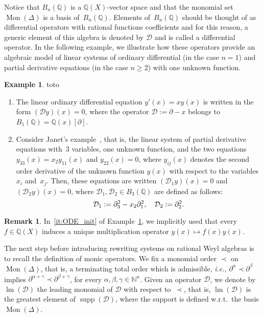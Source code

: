 \documentclass[11pt]{article}
\theoremstyle{definition}
\newtheorem{remark}[theorem]{Remark}
\newtheorem{example}[theorem]{Example}
\newcommand\ie{\emph{i.e.}}
\newcommand\D{\mathcal{D}}
\DeclareMathOperator{\supp}{supp}
\DeclareMathOperator{\lm}{lm}
\newcommand\Q{\mathbb{Q}}
\newcommand\N{\mathbb{N}}
\newcommand\Weyl[1]{B_{#1}(\Q)}
\newcommand\monBasis{\Mon(\Delta)}
\DeclareMathOperator{\Mon}{Mon}
\begin{document}
Notice that $\Weyl{n}$ is a $\Q(X)$-vector space and that the monomial 
set $\monBasis$ is a basis of~$\Weyl{n}$. Elements of~$\Weyl{n}$ should 
be thought of as differential operators with rational functions 
coefficients and for this reason, a generic element of this algebra is
denoted by $\D$ and is called a differential operator. In the following
example, we illustrate how these operators provide an algebraic model of
linear systems of ordinary differential (in the case $n=1$) and partial
derivative equations (in the case $n\geq 2$) with one unknown function. 
\smallskip

\begin{example}\label{ex:diff_operators_init}
  {\color{white}toto}
  \begin{enumerate}
  \item\label{it:ODE_init} The linear ordinary differential equation
    $y'(x)=xy(x)$ is written in the form $(\D y)(x)=0$, where the operator
    $\D:=\partial-x$ belongs to $\Weyl{1}=\Q(x)[\partial]$. 
  \item\label{it:Janet_example_init} Consider Janet's
    example~\cite{MR1308976}, that is, the linear system of partial
    derivative equations with~$3$ variables, one unknown function, and
    the two equations $y_{33}(x)=x_2y_{11}(x)$ and $y_{22}(x)=0$, where
    $y_{ij}(x)$ denotes the second order derivative of the unknown
    function $y(x)$ with respect to the variables $x_i$ and~$x_j$. Then,
    these equations are written $(\D_1y)(x)=0$ and $(\D_2y)(x)=0$, where
    $\D_1,\D_2\in\Weyl{3}$ are defined as follows:
    \[\D_1:=\partial_3^2-x_2\partial_1^2,\quad \D_2:=\partial_2^2.
    \smallskip\]
  \end{enumerate}
\end{example}

\begin{remark}
  In~\ref{it:ODE_init} of Example~\ref{ex:diff_operators_init}, we
  implicitly used that every $f\in\Q(X)$ induces a unique multiplication
  operator $y(x)\mapsto f(x)y(x)$.
\end{remark}
\smallskip

The next step before introducing rewriting systems on rational Weyl
algebras is to recall the definition of monic operators. We fix a
monomial order $\prec$ on $\monBasis$, that is, a terminating total 
order which is admissible, \ie, $\partial^{\alpha}\prec\partial^{\beta}$
implies $\partial^{\alpha+\gamma}\prec\partial^{\beta+\gamma}$, for every
$\alpha,\beta,\gamma\in\N^n$. Given an operator $\D$, we denote by
$\lm(\D)$ the leading monomial of $\D$ with respect to~$\prec$, that 
is, $\lm(\D)$ is the greatest element of $\supp(\D)$, where the support 
is defined w.r.t.\ the basis $\monBasis$. 
\smallskip
\end{document}
